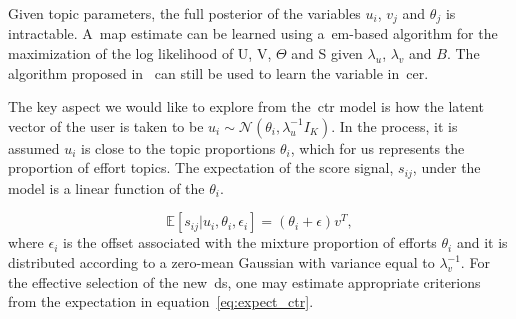 Given topic parameters, the full posterior of the variables $u_{i}$, $v_{j}$ and $\theta_{j}$ is intractable. A~\gls{map} estimate can be learned using a~\gls{em}-based algorithm for the maximization of the log likelihood of U, V, $\Theta$ and S given $\lambda_{u}$, $\lambda_{v}$ and $B$. The algorithm proposed in~\cite{wang_collaborative_2011} can still be used to learn the variable in~\gls{cer}. 

The key aspect we would like to explore from the~\gls{ctr} model is how the latent vector of the user is taken to be $u_{i} \sim \mathcal{N}(\theta_{i}, \lambda_{u}^{-1}I_{K})$.
In the process, it is assumed $u_{i}$ is close to the topic proportions $\theta_{i}$, which for us represents the proportion of effort topics. The expectation of the score signal, $s_{ij}$, under the model is a linear function of the $\theta_{i}$.

\begin{equation}
    \mathbb{E}[s_{ij}|u_{i}, \theta_{i}, \epsilon_{i}] = (\theta_{i} + \epsilon)v^{T},
    \label{eq:expect_ctr}
\end{equation}
where $\epsilon_{i}$ is the offset associated with the mixture proportion of efforts $\theta_{i}$ and it is distributed according to a zero-mean Gaussian with variance equal to $\lambda_{v}^{-1}$. For the effective selection of the new~\gls{ds}, one may estimate appropriate criterions from the expectation in equation~\ref{eq:expect_ctr}.


